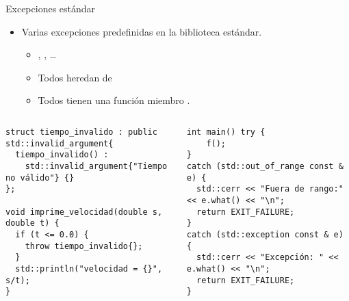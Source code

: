 \begin{frame}[t,fragile]{Excepciones estándar}
\begin{itemize}
  \item Varias excepciones predefinidas en la biblioteca estándar.
    \begin{itemize}
      \item {}, , \ldots
      \item Todos heredan de 
      \item Todos tienen una función miembro .
    \end{itemize}
\end{itemize}

\begin{columns}[T]

\begin{lstlisting}
struct tiempo_invalido : public std::invalid_argument{
  tiempo_invalido() :
    std::invalid_argument{"Tiempo no válido"} {}
};

void imprime_velocidad(double s, double t) {
  if (t <= 0.0) {
    throw tiempo_invalido{};
  }
  std::println("velocidad = {}", s/t);
}
\end{lstlisting}

\begin{lstlisting}
int main() try {
    f();
}
catch (std::out_of_range const & e) {
  std::cerr << "Fuera de rango:" << e.what() << "\n";
  return EXIT_FAILURE;
}
catch (std::exception const & e) {
  std::cerr << "Excepción: " << e.what() << "\n";
  return EXIT_FAILURE;
}
\end{lstlisting}
\end{columns}

\end{frame}
